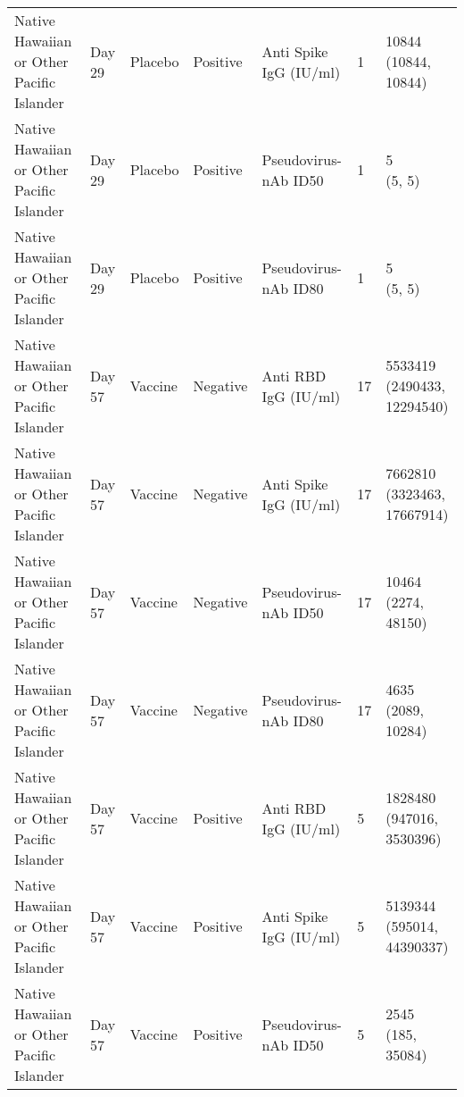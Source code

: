 \documentclass[]{book}
\theoremstyle{definition}
\theoremstyle{definition}
\theoremstyle{definition}
\newcommand{\1}{\mathbbm{1}}
\begin{document}
\begin{landscape}
\begin{ThreePartTable}
\begin{longtable}[t]{>{\raggedright\arraybackslash}p{7cm}llllll}
\hspace{1em}Native Hawaiian or Other Pacific Islander & Day 29 & Placebo & Positive & Anti Spike IgG (IU/ml) & 1 & \makecell[l]{10844\\(10844, 10844)}\\
\hspace{1em}Native Hawaiian or Other Pacific Islander & Day 29 & Placebo & Positive & Pseudovirus-nAb ID50 & 1 & \makecell[l]{5\\(5, 5)}\\
\hspace{1em}Native Hawaiian or Other Pacific Islander & Day 29 & Placebo & Positive & Pseudovirus-nAb ID80 & 1 & \makecell[l]{5\\(5, 5)}\\
\hspace{1em}Native Hawaiian or Other Pacific Islander & Day 57 & Vaccine & Negative & Anti RBD IgG (IU/ml) & 17 & \makecell[l]{5533419\\(2490433, 12294540)}\\
\hspace{1em}Native Hawaiian or Other Pacific Islander & Day 57 & Vaccine & Negative & Anti Spike IgG (IU/ml) & 17 & \makecell[l]{7662810\\(3323463, 17667914)}\\
\hspace{1em}Native Hawaiian or Other Pacific Islander & Day 57 & Vaccine & Negative & Pseudovirus-nAb ID50 & 17 & \makecell[l]{10464\\(2274, 48150)}\\
\hspace{1em}Native Hawaiian or Other Pacific Islander & Day 57 & Vaccine & Negative & Pseudovirus-nAb ID80 & 17 & \makecell[l]{4635\\(2089, 10284)}\\
\hspace{1em}Native Hawaiian or Other Pacific Islander & Day 57 & Vaccine & Positive & Anti RBD IgG (IU/ml) & 5 & \makecell[l]{1828480\\(947016, 3530396)}\\
\hspace{1em}Native Hawaiian or Other Pacific Islander & Day 57 & Vaccine & Positive & Anti Spike IgG (IU/ml) & 5 & \makecell[l]{5139344\\(595014, 44390337)}\\
\hspace{1em}Native Hawaiian or Other Pacific Islander & Day 57 & Vaccine & Positive & Pseudovirus-nAb ID50 & 5 & \makecell[l]{2545\\(185, 35084)}\\

\end{longtable}
\end{ThreePartTable}
\end{landscape}
\end{document}
